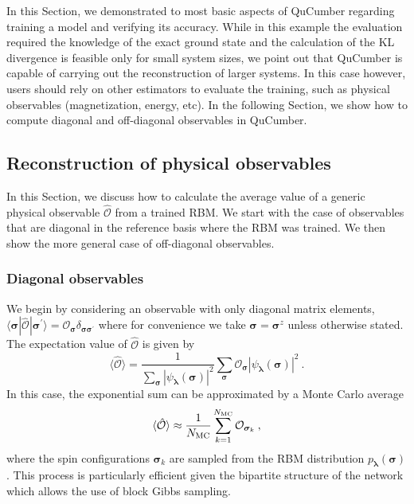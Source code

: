 \documentclass[submission, Phys, hidelnks]{SciPost}
\begin{document}
In this Section, we demonstrated to most basic aspects of QuCumber regarding training a model and verifying its accuracy. While in this example the evaluation required the knowledge of the exact ground state and the calculation of the KL divergence is feasible only for small system sizes, we point out that QuCumber is capable of carrying out the reconstruction of larger systems. In this case however, users should rely on other estimators to evaluate the training, such as physical observables (magnetization, energy, etc).
In the following Section, we show how to compute diagonal and off-diagonal observables in QuCumber. 

\subsection{Reconstruction of physical observables} \label{Sec:Sampling_a-Trained_RBM}
In this Section, we discuss how to calculate the average value of a generic physical observable $\hat{\mathcal{O}}$ from a trained RBM. We start with the case of observables that are diagonal in the reference basis where the RBM was trained. We then show the more general case of off-diagonal observables.

\subsubsection{Diagonal observables}
We begin by considering an observable with only diagonal matrix elements,
$\langle\bm{\sigma}|\hat{\mathcal{O}}|\bm{\sigma}^{\prime}\rangle=\mathcal{O}_{\bm{\sigma}}\delta_{\bm{\sigma\sigma}^\prime}$ where for convenience we take $\bm{\sigma}=\bm{\sigma}^z$ unless otherwise stated.
The expectation value of $\hat{\mathcal{O}}$ is given by
\begin{equation}
    \langle \hat{\mathcal{O}} \rangle = \frac{1}{\sum_{\bm{\sigma}} |\psi_{\bm{\lambda}}(\bm{\sigma})|^2}
    \sum_{\bm{\sigma}} \mathcal{O}_{\bm{\sigma}}|\psi_{\bm{\lambda}}(\bm{\sigma})|^2\:.
\end{equation}
In this case, the exponential sum can be approximated by a Monte Carlo average
\begin{equation}
    \langle \hat{\mathcal{O}}\rangle \approx \frac{1}{N_{\rm MC}} \sum_{k=1}^{N_{\rm MC}} \mathcal{O}_{\bm{\sigma}_k}\:,
\end{equation}
where the spin configurations $\bm{\sigma}_k$ are sampled from the RBM distribution $p_{\bm{\lambda}}(\bm{\sigma})$. This process is particularly efficient given the bipartite structure of the network which allows the use of block Gibbs sampling. 
\end{document}
